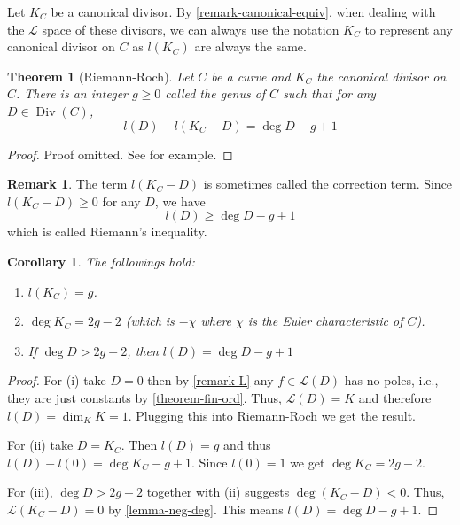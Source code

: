 \documentclass[12pt]{article}
\newtheorem{theorem}{Theorem}[subsection]
\newtheorem{corollary}{Corollary}[subsection]
\theoremstyle{remark}
\theoremstyle{definition}
\newtheorem{remark}{Remark}[subsection]
\newcommand{\Div}[0]{\operatorname{Div}}
\begin{document}
        Let $K_C$ be a canonical divisor. By \autoref{remark-canonical-equiv}, when dealing with the $\mathcal L$ space of these divisors, we can always use the notation $K_C$ to represent any canonical divisor on $C$ as $l(K_C)$ are always the same.
        \begin{theorem}[Riemann-Roch]\label{theorem-rr}
            Let $C$ be a curve and $K_C$ the canonical divisor on $C$. There is an integer $g\geqslant 0$ called the \textup{genus of $C$} such that for any $D\in\Div(C)$,
            \[l(D)-l(K_C-D)=\deg D-g+1\]
        \end{theorem}
        \begin{proof}
            Proof omitted. See \cite{hartshorne_2010_algebraic} for example.
        \end{proof}
        \begin{remark}
            The term $l(K_C-D)$ is sometimes called the correction term. Since $l(K_C-D)\geqslant 0$ for any $D$, we have
            \[l(D)\geqslant \deg D-g+1\]
            which is called Riemann's inequality.
        \end{remark}
        \begin{corollary}\label{corollary-rr-simple}
            The followings hold:
            \begin{enumerate}[\normalfont(i)]
                \item $l(K_C)=g$.
                \item $\deg K_C=2g-2$ (which is $-\chi$ where $\chi$ is the Euler characteristic of $C$).
                \item If $\deg D>2g-2$, then $l(D)=\deg D-g+1$
            \end{enumerate}
        \end{corollary}
        \begin{proof}
            For (i) take $D=0$ then by \autoref{remark-L} any $f\in \mathcal L(D)$ has no poles, i.e., they are just constants by \autoref{theorem-fin-ord}. Thus, $\mathcal L(D)=K$ and therefore $l(D)=\dim_K K=1$. Plugging this into Riemann-Roch we get the result.
            
            For (ii) take $D=K_C$. Then $l(D)=g$ and thus $l(D)-l(0)=\deg K_C-g+1$. Since $l(0)=1$ we get $\deg K_C=2g-2$.
            
            For (iii), $\deg D>2g-2$ together with (ii) suggests $\deg(K_C-D)<0$. Thus, $\mathcal L(K_C-D)=0$ by \autoref{lemma-neg-deg}. This means $l(D)=\deg D-g+1$.
        \end{proof}
        
\end{document}
